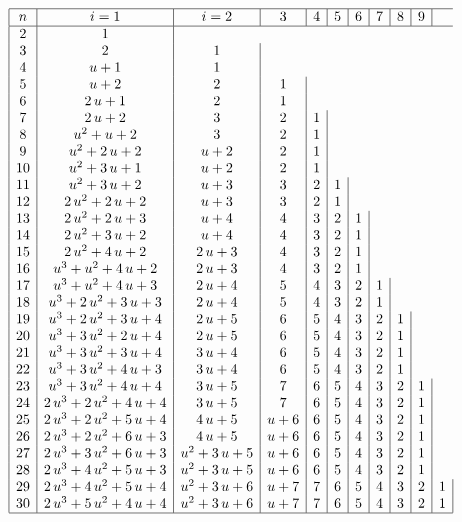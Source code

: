       \begin{displaymath}
        \begin {array}{|c|c|c|c|c|c|c|c|c|c|c|c|} 
          \hline
          n & i=1 & i=2 & 3 & 4 & 5 & 6 & 7 &8 & 9\\ \hline
2&1\\
3&2&1\\
4&u+1&1\\
5&u+2&2&1\\
6&2\,u+1&2&1\\
7&2\,u+2&3&2&1\\
8&{u}^{2}+u+2&3&2&1\\
9&{u}^{2}+2\,u+2&u+2&2&1\\
10&{u}^{2}+3\,u+1&u+2&2&1\\
11&{u}^{2}+3\,u+2&u+3&3&2&1\\
12&2\,{u}^{2}+2\,u+2&u+3&3&2&1
\\13&2\,{u}^{2}+2\,u+3&u+4&4&3&2&1
\\14&2\,{u}^{2}+3\,u+2&u+4&4&3&2&1
\\15&2\,{u}^{2}+4\,u+2&2\,u+3&4&3&
2&1\\16&{u}^{3}+{u}^{2}+4\,u+2&2
\,u+3&4&3&2&1\\17&{u}^{3}+{u}^{2
}+4\,u+3&2\,u+4&5&4&3&2&1\\18&{u}^
{3}+2\,{u}^{2}+3\,u+3&2\,u+4&5&4&3&2&1\\
19&{u}^{3}+2\,{u}^{2}+3\,u+4&2\,u+5&6&
5&4&3&2&1\\
20&{u}^{3}+3\,{u}^{2}+2\,
u+4&2\,u+5&6&5&4&3&2&1\\
21&{u}^{3}+3\,{u}^{2}+3\,u+4&3\,u+4&6&5&4&3&2&1\\
22&{u}^{3}+3\,{u}^{2}+4\,u+3&3\,u+4&6&5&4&3&2&1\\23&{u}^{3}+3\,{u}^{2}+4\,
u+4&3\,u+5&7&6&5&4&3&2&1\\24&2\,{u}^{3
}+2\,{u}^{2}+4\,u+4&3\,u+5&7&6&5&4&3&2&1\\
25&2\,{u}^{3}+2\,{u}^{2}+5\,u+4&4\,u+5
&u+6&6&5&4&3&2&1 \\
26&2\,{u}^{3}+2\,{u}^{2}+6\,u+3&4\,u+5
&u+6&6&5&4&3&2&1\\
27&2\,{u}^{3}+3\,{u}^{2}+6\,u+3&{u}^{2}+3\,u+5&u+6&6&5&4&3&2&1
\\
28&2\,{u}^{3}+4\,{u}^{2}+5\,
u+3&{u}^{2}+3\,u+5&u+6&6&5&4&3&2&1
\\
29&2\,{u}^{3}+4\,{u}^{2}+5\,u+4&{u}^{2
}+3\,u+6&u+7&7&6&5&4&3&2&1\\
30&2\,{u}^{3}+5\,{u}^{2}+4\,u+4&{u}^{2}+3\,u+6&u+7&7&6&5&4
&3&2&1
\\ \hline
\end {array}
      \end{displaymath}
